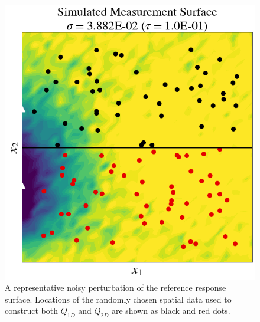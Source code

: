 \begin{frame}[t]
\begin{figure}[htbp]
\centering
    \includegraphics[width=0.5\linewidth]{figures/pde-highd/pde-highd_sensors_D2.png}
\caption{
A representative noisy perturbation of the reference response surface. Locations of the randomly chosen spatial data used to construct both $Q_{1D}$ and $Q_{2D}$ are shown as black and red dots.
}
\label{fig:pde-Q}
\end{figure}
\end{frame}



